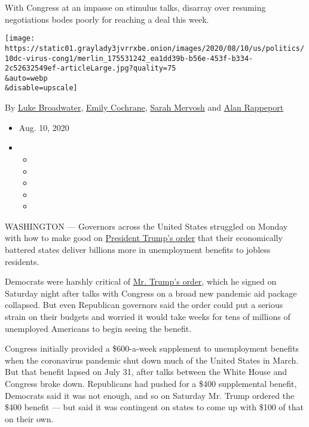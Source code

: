 With Congress at an impasse on stimulus talks, disarray over resuming
negotiations bodes poorly for reaching a deal this week.

\texttt{[image: https://static01.graylady3jvrrxbe.onion/images/2020/08/10/us/politics/10dc-virus-cong1/merlin\_175531242\_ea1dd39b-b56e-453f-b334-2c52632549ef-articleLarge.jpg?quality=75\\\&auto=webp\\\&disable=upscale]}

By \href{https://www.nytimes3xbfgragh.onion/by/luke-broadwater}{Luke
Broadwater},
\href{https://www.nytimes3xbfgragh.onion/by/emily-cochrane}{Emily
Cochrane},
\href{https://www.nytimes3xbfgragh.onion/by/sarah-mervosh}{Sarah
Mervosh} and
\href{https://www.nytimes3xbfgragh.onion/by/alan-rappeport}{Alan
Rappeport}

\begin{itemize}
\item
  Aug. 10, 2020
\item
  \begin{itemize}
  \item
  \item
  \item
  \item
  \item
  \end{itemize}
\end{itemize}

WASHINGTON --- Governors across the United States struggled on Monday
with how to make good on
\href{https://www.nytimes3xbfgragh.onion/2020/08/08/us/politics/trump-stimulus-bill-coronavirus.html}{President
Trump's order} that their economically battered states deliver billions
more in unemployment benefits to jobless residents.

Democrats were harshly critical of
\href{https://www.nytimes3xbfgragh.onion/2020/08/10/business/economy/trump-payroll-tax-holiday.html}{Mr.
Trump's order}, which he signed on Saturday night after talks with
Congress on a broad new pandemic aid package collapsed. But even
Republican governors said the order could put a serious strain on their
budgets and worried it would take weeks for tens of millions of
unemployed Americans to begin seeing the benefit.

Congress initially provided a \$600-a-week supplement to unemployment
benefits when the coronavirus pandemic shut down much of the United
States in March. But that benefit lapsed on July 31, after talks between
the White House and Congress broke down. Republicans had pushed for a
\$400 supplemental benefit, Democrats said it was not enough, and so on
Saturday Mr. Trump ordered the \$400 benefit --- but said it was
contingent on states to come up with \$100 of that on their own.

